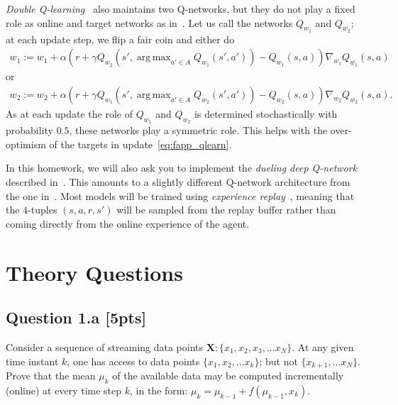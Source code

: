 \documentclass[12pt]{article}
\DeclareMathOperator*{\argmax}{arg\,max}
\begin{document}
\emph{Double Q-learning}~\cite{van2016deep} also maintains two Q-networks, but they do not play a fixed role as online and target networks as in~\cite{mnih2013playing, mnih2015human}. Let us call the networks $Q _{w _1}$ and $Q _{w _2}$; at each update step, we flip a fair coin and either do 
\begin{align}
	{w _1} := {w _1} + 
		\alpha \left( 
			r + \gamma Q _{w _2}
				(
					s', \argmax _{a' \in A} Q _{w _1} (s', a')
				) 
				- Q _{w _1}(s, a) 
		\right) \nabla _{w _1} 
			Q _{w _1} (s, a) 
\end{align}
or 
\begin{align*}
	{w _2} := {w _2} + 
		\alpha \left( 
			r + \gamma Q _{w _1}
				(
					s', \argmax _{a' \in A} Q _{w _2} (s', a')
				) 
				- Q _{w _2}(s, a) 
		\right) \nabla _{w _2} 
			Q _{w _2} (s, a) .	
\end{align*}
As at each update the role of $Q _{w _1}$ and $Q _{w _2}$ is determined stochastically with probability $0.5$, these networks play a symmetric role. This helps with the over-optimism of the targets in update~\eqref{eq:fapp_qlearn}.
\fi

In this homework, we will also ask you to implement the \emph{dueling deep Q-network} described in~\cite{wang2015dueling}. This amounts to a slightly different Q-network architecture from the 
one in~\cite{mnih2013playing, mnih2015human}. Most models will be trained using \emph{experience replay}~\cite{mnih2013playing, mnih2015human}, meaning that the $4$-tuples $(s, a, r, s')$ will be sampled from the replay buffer rather than coming directly from the online experience of the agent.

\pagebreak[4]

\section{Theory Questions}
\subsection*{Question 1.a \textbf{[5pts]}}

Consider a sequence of streaming data points $\mathbf{X}: \{ x_1, x_2, x_3, ... x_N\}$. At any given time instant $k$, one has access to data points $\{ x_1, x_2, ... x_k\}$; but not $\{ x_{k+1}, ... x_N\}$. 
Prove that the mean $\mu_k$ of the available data may be computed incrementally (online) at every time step $k$, in the form: $\mu_k =\mu_{k-1} + f(\mu_{k-1}, x_k)$.\\
\end{document}
